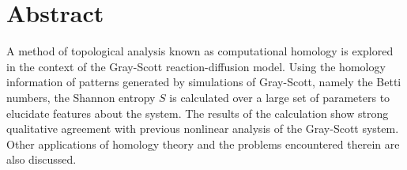     \chapter*{Abstract}

A method of topological analysis known as computational homology is explored in the context of the Gray-Scott reaction-diffusion model. Using the homology information of patterns generated by simulations of Gray-Scott, namely the Betti numbers, the Shannon entropy $S$ is calculated over a large set of parameters to elucidate features about the system. The results of the calculation show strong qualitative agreement with previous nonlinear analysis of the Gray-Scott system. Other applications of homology theory and the problems encountered therein are also discussed.